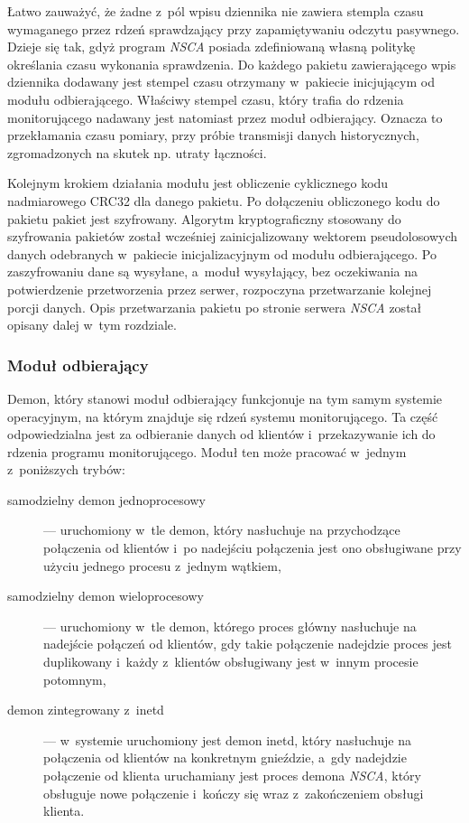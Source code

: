 Łatwo zauważyć, że żadne z~pól wpisu dziennika nie zawiera stempla
czasu wymaganego przez rdzeń sprawdzający przy zapamiętywaniu odczytu
pasywnego. Dzieje się tak, gdyż program {\em NSCA} posiada zdefiniowaną
własną politykę określania czasu wykonania sprawdzenia. Do każdego
pakietu zawierającego wpis dziennika dodawany jest stempel czasu
otrzymany w~pakiecie inicjującym od modułu odbierającego. Właściwy
stempel czasu, który trafia do rdzenia monitorującego nadawany jest
natomiast przez moduł odbierający. Oznacza to przekłamania czasu
pomiary, przy próbie transmisji danych historycznych, zgromadzonych na
skutek np. utraty łączności.

Kolejnym krokiem działania modułu jest obliczenie cyklicznego kodu
nadmiarowego CRC32 dla danego pakietu. Po dołączeniu obliczonego kodu
do pakietu pakiet jest szyfrowany. Algorytm kryptograficzny stosowany
do szyfrowania pakietów został wcześniej zainicjalizowany wektorem
pseudolosowych danych odebranych w~pakiecie inicjalizacyjnym od modułu
odbierającego. Po zaszyfrowaniu dane są wysyłane, a~moduł wysyłający,
bez oczekiwania na potwierdzenie przetworzenia przez serwer,
rozpoczyna przetwarzanie kolejnej porcji danych. Opis przetwarzania
pakietu po stronie serwera {\em NSCA} został opisany dalej w~tym rozdziale.

\subsubsection[Moduł odbierający][Moduł odbierający]{Moduł odbierający}

Demon, który stanowi moduł odbierający funkcjonuje na tym samym
systemie operacyjnym, na którym znajduje się rdzeń systemu
monitorującego. Ta część odpowiedzialna jest za odbieranie danych od
klientów i~przekazywanie ich do rdzenia programu monitorującego. Moduł
ten może pracować w~jednym z~poniższych trybów:

\begin{description}
\item[samodzielny demon jednoprocesowy] --- uruchomiony w~tle demon, który
  nasłuchuje na przychodzące połączenia od klientów i~po nadejściu
  połączenia jest ono obsługiwane przy użyciu jednego procesu z~jednym
  wątkiem,
\item[samodzielny demon wieloprocesowy] --- uruchomiony w~tle demon,
  którego proces główny nasłuchuje na nadejście połączeń od klientów,
  gdy takie połączenie nadejdzie proces jest duplikowany i~każdy
  z~klientów obsługiwany jest w~innym procesie potomnym,
\item[demon zintegrowany z~inetd] --- w~systemie uruchomiony jest demon
  inetd, który nasłuchuje na połączenia od klientów na konkretnym
  gnieździe, a~gdy nadejdzie połączenie od klienta uruchamiany jest
  proces demona {\em NSCA}, który obsługuje nowe połączenie i~kończy się
  wraz z~zakończeniem obsługi klienta.
\end{description}

